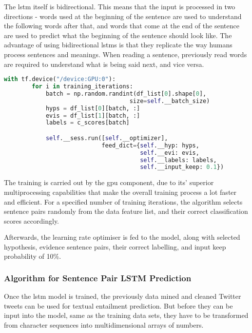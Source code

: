             The \gls{lstm} itself is bidirectional. This means that the input is processed in two directions - words used at the beginning of the sentence are used to understand the following words after that, and words that come at the end of the sentence are used to predict what the beginning of the sentence should look like. The advantage of using bidirectional \gls{lstm}s is that they replicate the way humans process sentences and meanings. When reading a sentence, previously read words are required to understand what is being said next, and vice versa.
            
            \begin{lstlisting}[language=Python, caption=LSTM Training Algorithm, label=code:lstmtraining]
    with tf.device("/device:GPU:0"):
        for i in training_iterations:
            batch = np.random.randint(df_list[0].shape[0], 
                                    size=self.__batch_size)
            hyps = df_list[0][batch, :]
            evis = df_list[1][batch, :]
            labels = c_scores[batch]

            self.__sess.run([self.__optimizer], 
                            feed_dict={self.__hyp: hyps,
                                       self.__evi: evis,
                                       self.__labels: labels,
                                       self.__input_keep: 0.1})
            \end{lstlisting}
            \FloatBarrier
        
            The training is carried out by the \gls{gpu} component, due to its' superior multiprocessing capabilities that make the overall training process a lot faster and efficient. For a specified number of training iterations, the algorithm selects sentence pairs randomly from the data feature list, and their correct classification scores accordingly.
            
            Afterwards, the learning rate optimiser is fed to the model, along with selected hypothesis, evidence sentence pairs, their correct labelling, and input keep probability of 10\%.
            
        \subsubsection{Algorithm for Sentence Pair LSTM Prediction}
            
            Once the \gls{lstm} model is trained, the previously data mined and cleaned Twitter tweets can be used for textual entailment prediction. But before they can be input into the model, same as the training data sets, they have to be transformed from character sequences into multidimensional arrays of numbers.
            

